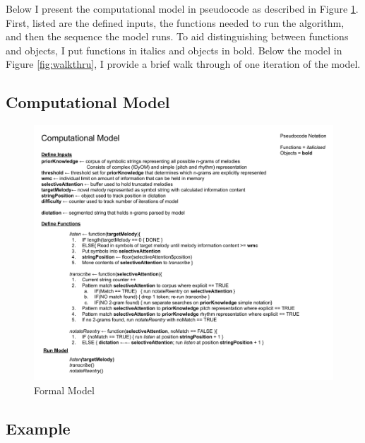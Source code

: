 \documentclass[]{book}
\begin{document}
Below I present the computational model in pseudocode as described in Figure \ref{fig:mymodel}.
First, listed are the defined inputs, the functions needed to run the algorithm, and then the sequence the model runs.
To aid distinguishing between functions and objects, I put functions in italics and objects in bold.
Below the model in Figure \ref{fig:walkthru}, I provide a brief walk through of one iteration of the model.

\hypertarget{computational-model-1}{%
\subsection{Computational Model}\label{computational-model-1}}

\begin{figure}

{\centering \includegraphics[width=1\linewidth]{img/Model} 

}

\caption{Formal Model}\label{fig:mymodel}
\end{figure}

\hypertarget{example}{%
\subsection{Example}\label{example}}
\end{document}
